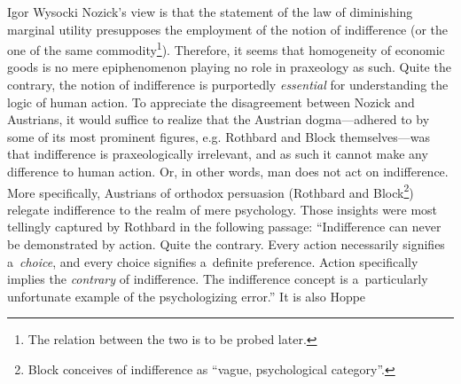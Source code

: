 \begin{artengenv}{Igor Wysocki}
Nozick's view is that the statement of the law of diminishing marginal utility presupposes the employment of the notion of indifference (or the one of the same commodity\footnote{The relation between the two is to be probed later. }). Therefore, it seems that homogeneity of economic goods is no mere epiphenomenon playing no role in praxeology as such. Quite the contrary, the notion of indifference is purportedly \textit{essential} for understanding the logic of human action. To appreciate the disagreement between Nozick and Austrians, it would suffice to realize that the Austrian dogma---adhered to by some of its most prominent figures, e.g. Rothbard and Block themselves---was that indifference is praxeologically irrelevant, and as such it cannot make any difference to human action. Or, in other words, man does not act on indifference. More specifically, Austrians of orthodox persuasion (Rothbard and Block\footnote{Block
\parencite*[][pp.22–24]{block_austrian_1999} %
 conceives of indifference as ``vague, psychological category''.}) relegate indifference to the realm of mere psychology. Those insights were most tellingly captured by Rothbard 
\parencite*[][p.304]{rothbard_toward_2011} %
 in the following passage: ``Indifference can never be demonstrated by action. Quite the contrary. Every action necessarily signifies a~\textit{choice}, and every choice signifies a~definite preference. Action specifically implies the \textit{contrary} of indifference. The indifference concept is a~particularly unfortunate example of the psychologizing error.'' It is also Hoppe 

\end{artengenv}
